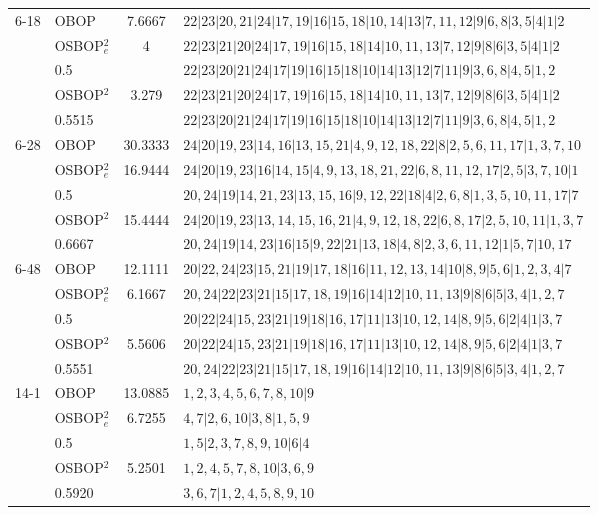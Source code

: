 \documentclass[preprint,12pt]{article}
\theoremstyle{definition}
\theoremstyle{remark}
\theoremstyle{example} %
\begin{document}
\begin{table}
\begin{scriptsize}
\begin{tabular}{llcl}
6-18	&	OBOP &   7.6667 &       $22|23|20,21|24|17,19|16|15,18|10,14|13|7,11,12|9|6,8|3,5|4|1|2$	\\  \cline{2-4}
    &   OSBOP$^2_e$  &  4       &   $22|23|21|20|24|17,19|16|15,18|14|10,11,13|7,12|9|8|6|3,5|4|1|2$  \\
    &   0.5        &        &       $22|23|20|21|24|17|19|16|15|18|10|14|13|12|7|11|9|3,6,8|4,5|1,2$ \\ \cline{2-4}
    &   OSBOP$^2$   &   3.279  &    $22|23|21|20|24|17,19|16|15,18|14|10,11,13|7,12|9|8|6|3,5|4|1|2$  \\
    &   0.5515   &          &       $22|23|20|21|24|17|19|16|15|18|10|14|13|12|7|11|9|3,6,8|4,5|1,2$  \\\hline
    
6-28 &	OBOP    &   30.3333   &     $24|20|19,23|14,16|13,15,21|4,9,12,18,22|8|2,5,6,11,17|1,3,7,10$	\\  \cline{2-4}
    &   OSBOP$^2_e$  &   16.9444  & $24|20|19,23|16|14,15|4,9,13,18,21,22|6,8,11,12,17|2,5|3,7,10|1$ \\
    &   0.5    &           &        $20,24|19|14,21,23|13,15,16|9,12,22|18|4|2,6,8|1,3,5,10,11,17|7$ \\ \cline{2-4}
    &   OSBOP$^2$   &   15.4444   & $24|20|19,23|13,14,15,16,21|4,9,12,18,22|6,8,17|2,5,10,11|1,3,7$  \\
    &   0.6667        &       &     $20,24|19|14,23|16|15|9,22|21|13,18|4,8|2,3,6,11,12|1|5,7|10,17$  \\\hline
    
6-48 &	OBOP    &   12.1111   &       $20|22,24|23|15,21|19|17,18|16|11,12,13,14|10|8,9|5,6|1,2,3,4|7$	\\  \cline{2-4}
    &   OSBOP$^2_e$  &   6.1667   & $20,24|22|23|21|15|17,18,19|16|14|12|10,11,13|9|8|6|5|3,4|1,2,7$ \\
    &   0.5    &           &        $20|22|24|15,23|21|19|18|16,17|11|13|10,12,14|8,9|5,6|2|4|1|3,7$ \\ \cline{2-4}
    &   OSBOP$^2$   &   5.5606   &     $20|22|24|15,23|21|19|18|16,17|11|13|10,12,14|8,9|5,6|2|4|1|3,7$
      \\
    &   0.5551    &         &    $20,24|22|23|21|15|17,18,19|16|14|12|10,11,13|9|8|6|5|3,4|1,2,7$     \\\hline
    
14-1 &	OBOP    &   13.0885   &     $1,2,3,4,5,6,7,8,10|9$	\\  \cline{2-4}
    &   OSBOP$^2_e$  &   6.7255   & $4,7|2,6,10|3,8|1,5,9$ \\
    &   0.5    &           &        $1,5|2,3,7,8,9,10|6|4$ \\ \cline{2-4}
    &   OSBOP$^2$   &   5.2501   &  $1,2,4,5,7,8,10|3,6,9$  \\
    &   0.5920        &       &     $3,6,7|1,2,4,5,8,9,10$  \\\hline
    

\end{tabular}
\end{scriptsize}
\end{table}
\end{document}
